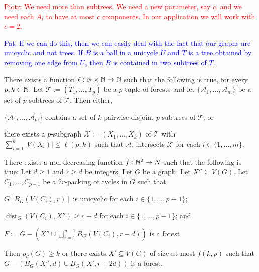 \documentclass{patmorin}
\newcommand{\pat}[1]{\textcolor{Blue}{Pat: #1}}
\newcommand{\piotr}[1]{\textcolor{red}{Piotr: #1}}
\DeclareMathOperator{\dist}{dist}
\begin{document}
\piotr{We need more than subtrees. We need a new parameter, say $c$, and we need each $A_i$ to have at most $c$ components. In our application we will work with $c=2$.}

\pat{If we can do this, then we can easily deal with the fact that our graphs are unicyclic and not trees.  If $B$ is a ball in a unicycle $U$ and $T$ is a tree obtained by removing one edge from $U$, then $B$ is contained in two subtrees of $T$.}

\begin{lem}\label{gyarfas_lehel}
  There exists a function $\ell:\mathbb{N}\times\mathbb{N}\to\mathbb{N}$ such that the following is true, for every $p,k\in\mathbb{N}$.
  Let $\mathcal{T}:=(T_1,\ldots,T_p)$ be a $p$-tuple of forests and let $\{\mathcal{A}_1,\ldots,\mathcal{A}_m\}$ be a set of $p$-subtrees of $\mathcal{T}$. Then either,
  \begin{compactenum}[(a)]
    \item $\{\mathcal{A}_1,\ldots,\mathcal{A}_m\}$ contains a set of $k$ pairwise-disjoint $p$-subtrees of $\mathcal{T}$; or
    \item there exists a $p$-subgraph $\mathcal{X}:=(X_1,\ldots,X_k)$ of $\mathcal{T}$ with $\sum_{i=1}^k|V(X_i)|\le \ell(p,k)$ such that $\mathcal{A}_i$ intersects $\mathcal{X}$ for each $i\in\{1,\ldots,m\}$.
  \end{compactenum}
\end{lem}

\begin{lem}\label{hungarian_method}
  There exists a non-decreasing function $f:\mathbb{N}^2\to N$ such that the following is true: Let $d\ge 1$ and $r\ge d$ be integers.
  Let $G$ be a graph. Let $X''\subseteq V(G)$. Let $C_1,\ldots,C_{p-1}$ be a $2r$-packing of cycles in $G$ such that
  \begin{compactenum}[(i)]
    \item $G[B_G(V(C_i),r)]$ is unicyclic for each $i\in\{1,\ldots,p-1\}$;
    \item $\dist_G(V(C_i),X'')\ge r+d$ for each $i\in\{1,\ldots,p-1\}$; and
    \item $F:=G-(X''\cup \bigcup_{i=1}^{p-1} B_G(V(C_i),r-d))$ is a forest.
  \end{compactenum}
  Then $\rho_d(G)\ge k$ or there exists $X'\subseteq V(G)$ of size at most $f(k,p)$ such that $G-(B_G(X'',d)\cup B_G(X',r+2d))$ is a forest.
\end{lem}
\end{document}
